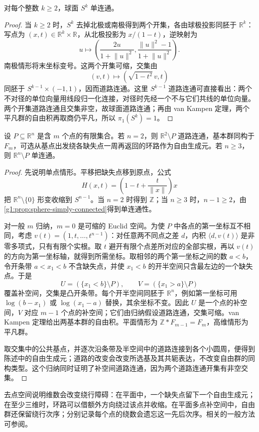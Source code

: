 \begin{proposition}\label{g1:prop:sphere-simply-connected}
	对每个整数 \(k\ge2\)，球面 \(S^k\) 单连通。
\end{proposition}
\begin{proof}
	当 \(k\ge2\) 时，\(S^k\) 去掉北极或南极得到两个开集，各由球极投影同胚于 \(\mathbb R^k\)：写点为 \((x,t)\in\mathbb R^k\times\mathbb R\)，从北极投影为 \(x/(1-t)\)，逆映射为
	\[
		u\longmapsto\left(\frac{2u}{1+\lVert u\rVert^2},
		\frac{\lVert u\rVert^2-1}{1+\lVert u\rVert^2}\right).
	\]
	南极情形将末坐标变号。这两个开集可缩，交集由
	\[
		(v,t)\longmapsto(\sqrt{1-t^2}\,v,t)
	\]
	同胚于 \(S^{k-1}\times(-1,1)\)，因而道路连通。这里 \(S^{k-1}\) 道路连通可直接看出：两个不对径的单位向量用线段归一化连接，对径时先经一个不与它们共线的单位向量。两个开集道路连通且交集非空，故球面道路连通；再由 van Kampen 定理，两个平凡群的自由积再取商仍平凡，所以 \(\pi_1(S^k)=1\)。
\end{proof}

\begin{proposition}\label{g1:prop:punctured-euclidean}
	设 \(P\subseteq\mathbb R^n\) 是含 \(m\) 个点的有限集合。若 \(n=2\)，则 \(\mathbb R^2\setminus P\) 道路连通，基本群同构于 \(F_m\)，可选从基点出发绕各缺失点一周再返回的环路作为自由生成元。若 \(n\ge3\)，则 \(\mathbb R^n\setminus P\) 单连通。
\end{proposition}
\begin{proof}
	先说明单点情形。平移把缺失点移到原点，公式
	\[
		H(x,t)=\left(1-t+\frac{t}{\lVert x\rVert}\right)x
	\]
	把 \(\mathbb R^n\setminus\{0\}\) 形变收缩到 \(S^{n-1}\)。当 \(n=2\) 时得到 \(\mathbb Z\)；当 \(n\ge3\) 时，\(n-1\ge2\)，由\cref{g1:prop:sphere-simply-connected}得到单连通性。

	对一般 \(m\) 归纳，\(m=0\) 是可缩的 Euclid 空间。为使 \(P\) 中各点的第一坐标互不相同，考虑 \(v(t)=(1,t,\ldots,t^{n-1})\)：对任意两不同点之差 \(d\)，内积 \(\langle d,v(t)\rangle\) 是非零多项式，只有有限个实根。取 \(t\) 避开有限个点差所对应的全部实根，再以 \(v(t)\) 的方向为第一坐标轴，就得到所需坐标。取相邻的两个第一坐标之间的数 \(a<b\)，令开条带 \(a<x_1<b\) 不含缺失点，并使 \(x_1<b\) 的开半空间只含最左边的一个缺失点。于是
	\[
		U=(\{x_1<b\}\setminus P),\qquad
		V=(\{x_1>a\}\setminus P)
	\]
	覆盖补空间，交集是凸开条带。每个开半空间同胚于 \(\mathbb R^n\)，例如第一坐标可用 \(\log(b-x_1)\) 或 \(\log(x_1-a)\) 替换，其余坐标不变。因此 \(U\) 是一个点的补空间，\(V\) 对应 \(m-1\) 个点的补空间；它们由归纳假设道路连通，交集可缩。van Kampen 定理给出两基本群的自由积。平面情形为 \(\mathbb Z*F_{m-1}=F_m\)，高维情形为平凡群。

	取交集中的公共基点，并逐次沿条带及半空间中的道路连接到各个小圆周，便得到陈述中的自由生成元；道路的改变会改变所选基及其共轭表达，不改变自由群的同构类型。这个归纳同时证明了补空间道路连通，因为两个道路连通开集有非空交集。
\end{proof}

去点空间说明维数会改变绕行障碍：在平面中，一个缺失点留下一个自由生成元；在至少三维时，环路可以借额外方向绕过该点并收缩。在平面多点补空间中，自由群还保留绕行次序；分别记录每个点的绕数会遗忘这一先后次序。相关的一般方法可参阅\cite[第1.2节]{Hatcher2002}。
